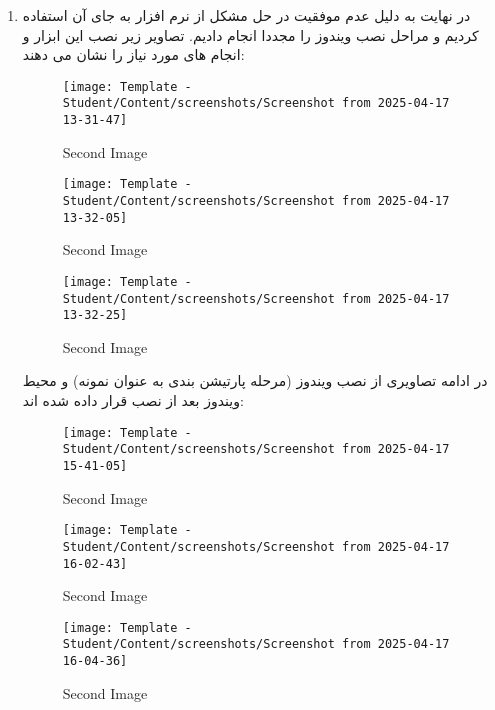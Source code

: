 \begin{enumerate}
    \item در نهایت به دلیل عدم موفقیت در حل مشکل   از نرم افزار  به جای آن استفاده کردیم و مراحل نصب ویندوز را مجددا انجام دادیم. تصاویر زیر نصب این ابزار و انجام  های مورد نیاز را نشان می دهند:
    \begin{figure}[htbp]
      \centering
      \texttt{[image: Template - Student/Content/screenshots/Screenshot from 2025-04-17 13-31-47]}
      \caption{Second Image}
      \label{fig:vert2}
    \end{figure}
    \begin{figure}[htbp]
      \centering
      \texttt{[image: Template - Student/Content/screenshots/Screenshot from 2025-04-17 13-32-05]}
      \caption{Second Image}
      \label{fig:vert2}
    \end{figure}
    \begin{figure}[htbp]
      \centering
      \texttt{[image: Template - Student/Content/screenshots/Screenshot from 2025-04-17 13-32-25]}
      \caption{Second Image}
      \label{fig:vert2}
    \end{figure}
  در ادامه تصاویری از نصب ویندوز (مرحله پارتیشن بندی به عنوان نمونه) و محیط ویندوز بعد از نصب قرار داده شده اند:
  \begin{figure}[htbp]
      \centering
      \texttt{[image: Template - Student/Content/screenshots/Screenshot from 2025-04-17 15-41-05]}
      \caption{Second Image}
      \label{fig:vert2}
    \end{figure}
    \begin{figure}[htbp]
      \centering
      \texttt{[image: Template - Student/Content/screenshots/Screenshot from 2025-04-17 16-02-43]}
      \caption{Second Image}
      \label{fig:vert2}
    \end{figure}
    \begin{figure}[htbp]
      \centering
      \texttt{[image: Template - Student/Content/screenshots/Screenshot from 2025-04-17 16-04-36]}
      \caption{Second Image}
      \label{fig:vert2}
    \end{figure}
 \end{enumerate}
